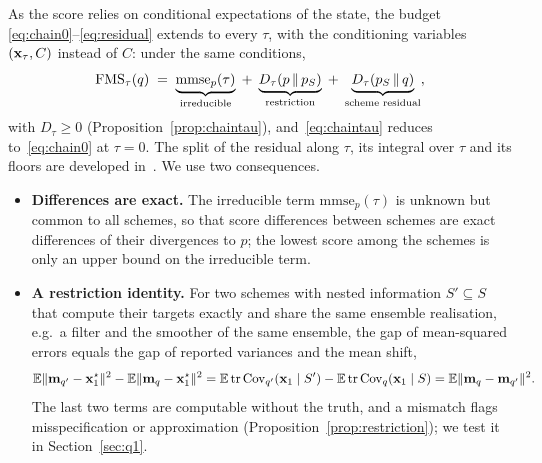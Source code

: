 As the score relies on conditional expectations of the state, the budget
\eqref{eq:chain0}--\eqref{eq:residual} extends to every $\tau$, with the conditioning
variables $(\mathbf{x}_\tau, C)$ instead of $C$: under the same conditions,
\begin{equation}\label{eq:chaintau}
  \mathrm{FMS}_\tau(q) \;=\;
  \underbrace{\mathrm{mmse}_p(\tau)}_{\text{irreducible}}
  \;+\; \underbrace{D_\tau(p \,\|\, p_S)}_{\text{restriction}}
  \;+\; \underbrace{D_\tau(p_S \,\|\, q)}_{\text{scheme residual}} ,
\end{equation}
with $D_\tau \ge 0$ (Proposition~\ref{prop:chaintau}), and~\eqref{eq:chaintau} reduces to~\eqref{eq:chain0} at $\tau = 0$. The
split of the residual along $\tau$, its integral over $\tau$ and its floors are developed
in~\cite{fablet_flow_2026}. We use two consequences.
\begin{itemize}
  \item \textbf{Differences are exact.} The irreducible term $\mathrm{mmse}_p(\tau)$ is
    unknown but common to all schemes, so that score differences between schemes are exact
    differences of their divergences to $p$; the lowest score among the schemes is only an
    upper bound on the irreducible term.
  \item \textbf{A restriction identity.} For two schemes with nested information
    $S' \subseteq S$ that compute their targets exactly and share the same ensemble
    realisation, e.g.\ a filter and the smoother of the same ensemble, the gap of
    mean-squared errors equals the gap of reported variances and the mean shift,
    \begin{equation}\label{eq:restriction_identity}
      \mathbb{E}\|\mathbf{m}_{q'} - \mathbf{x}_1^\star\|^2 - \mathbb{E}\|\mathbf{m}_{q} - \mathbf{x}_1^\star\|^2
      = \mathbb{E}\operatorname{tr}\operatorname{Cov}_{q'}(\mathbf{x}_1 \mid S') - \mathbb{E}\operatorname{tr}\operatorname{Cov}_{q}(\mathbf{x}_1 \mid S)
      = \mathbb{E}\|\mathbf{m}_{q} - \mathbf{m}_{q'}\|^2 .
    \end{equation}
    The last two terms are computable without the truth, and a mismatch flags
    misspecification or approximation (Proposition~\ref{prop:restriction}); we test it in Section~\ref{sec:q1}.
\end{itemize}

